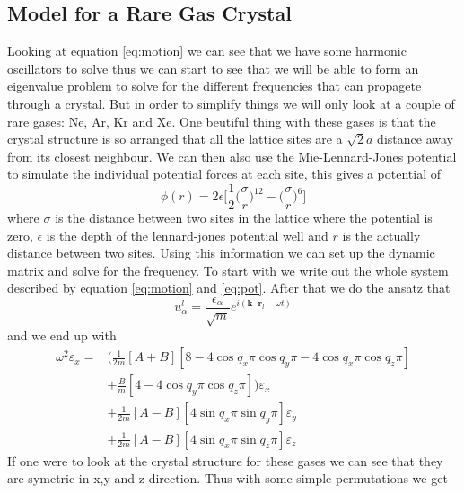 \documentclass[11pt]{article}
\begin{document}
\subsection{Model for a Rare Gas Crystal}
Looking at equation \ref{eq:motion} we can see that we have some harmonic oscillators to solve thus we can start to see that we will be able to form an eigenvalue problem to solve for the different frequencies that can propagete through a crystal. But in order to simplify things we will only look at a couple of rare gases: Ne, Ar, Kr and Xe. One beutiful thing with these gases is that the crystal structure is so arranged that all the lattice sites are a $\sqrt{2}a$ distance away from its closest neighbour. We can then also use the Mie-Lennard-Jones potential to simulate the individual potential forces at each site, this gives a potential of
\begin{equation}
	\phi(r) = 2 \epsilon \big[\frac{1}{2} \big(\frac{\sigma}{r}\big)^{12} - \big(\frac{\sigma}{r}\big)^6\big]
	\label{eq:pot}
\end{equation}
where $\sigma$ is the distance between two sites in the lattice where the potential is zero, $\epsilon$ is the depth of the lennard-jones potential well\cite{bib:wiki:mlj} and $r$ is the actually distance between two sites. Using this information we can set up the dynamic matrix and solve for the frequency. To start with we write out the whole system described by equation \ref{eq:motion} and \ref{eq:pot}. After that we do the ansatz that 
\begin{equation}
	u^l_{\alpha} = \frac{\epsilon_{\alpha}}{\sqrt{m}}e^{i(\mathbf{k}\cdot\mathbf{r}_l-\omega t)}
\end{equation}
and we end up with 
\begin{align}
	\omega^2\varepsilon_x = &\big( \frac{1}{2m} [A+B][8-4\cos{q_x\pi}\cos{q_y\pi}-4\cos{q_x\pi}\cos{q_z\pi}] \\
	&+ \frac{B}{m}[4-4\cos{q_y\pi}\cos{q_z\pi}]\big)\varepsilon_x \\
	&+\frac{1}{2m}[A-B][4\sin{q_x\pi}\sin{q_y\pi}]\varepsilon_y \\
	&+\frac{1}{2m}[A-B][4\sin{q_x\pi}\sin{q_z\pi}]\varepsilon_z
	\label{eq:omega}
\end{align}
If one were to look at the crystal structure for these gases we can see that they are symetric in x,y and z-direction. Thus with some simple permutations we get
\end{document}

